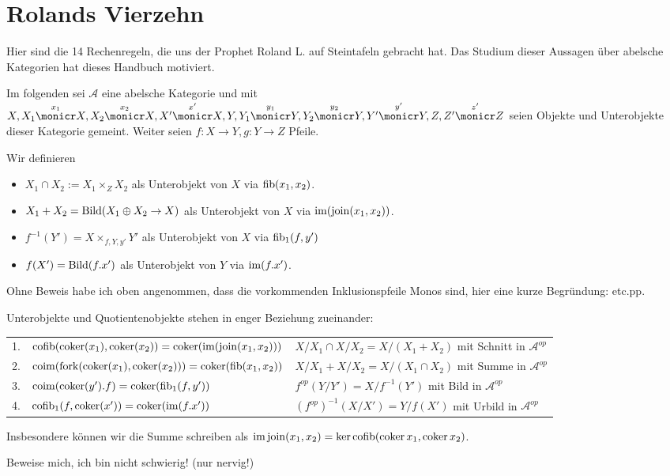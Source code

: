 \section{Rolands Vierzehn}

Hier sind die 14 Rechenregeln, die uns der Prophet Roland L. auf Steintafeln gebracht hat. Das Studium dieser Aussagen über abelsche Kategorien hat dieses Handbuch motiviert.

Im folgenden sei $\mathcal A$ eine abelsche Kategorie und mit $X,
X_1 \overset{x_1}\monicr X,
X_2 \overset{x_2}\monicr X,
X'  \overset{x'}\monicr X,
Y,
Y_1 \overset{y_1}\monicr Y,
Y_2 \overset{y_2}\monicr Y,
Y'  \overset{y'}\monicr Y,
Z,
Z'  \overset{z'}\monicr Z$
seien Objekte und Unterobjekte dieser Kategorie gemeint.
Weiter seien $f:X\to Y, g:Y\to Z$ Pfeile.

\begin{defn}[Objektnotation]
Wir definieren
\begin{itemize}
\item $X_1 \cap X_2 := X_1\times_Z X_2$ als Unterobjekt von $X$ via $\operatorname{fib}(x_1, x_2)$.
\item $X_1+X_2 = \operatorname{Bild}(X_1 \oplus X_2 \to X)$ als Unterobjekt von $X$ via $\operatorname{im}(\operatorname{join}(x_1,x_2))$.
\item $f^{-1}(Y') = X \times_{f,Y,y'} Y'$ als Unterobjekt von $X$ via $\operatorname{fib}_1(f,y')$
\item $f(X') = \operatorname{Bild}(f.x')$ als Unterobjekt von $Y$ via $\operatorname{im}(f.x')$.
\end{itemize}
\end{defn}

\begin{bem}
Ohne Beweis habe ich oben angenommen, dass die vorkommenden Inklusionspfeile Monos sind, hier eine kurze Begründung: etc.pp. %
\end{bem}

\begin{prop}[Reflexionsprinzip]
Unterobjekte und Quotientenobjekte stehen in enger Beziehung zueinander:

\begin{tabular}{rll}
   1.
&  $\operatorname{cofib}(\operatorname{coker}(x_1), \operatorname{coker}(x_2)) = \operatorname{coker}(\operatorname{im}(\operatorname{join}(x_1,x_2)))$
&  $X/X_1 \cap X/X_2 = X/(X_1+X_2)$ mit Schnitt in $\mathcal A^{op}$
\\ 2.
&  $\operatorname{coim}(\operatorname{fork}(\operatorname{coker}(x_1),\operatorname{coker}(x_2))) = \operatorname{coker}(\operatorname{fib}(x_1,x_2))$
&  $X/X_1 + X/X_2 = X/(X_1\cap X_2)$ mit Summe in $\mathcal A^{op}$
\\ 3.
&  $\operatorname{coim}(\operatorname{coker}(y').f) = \operatorname{coker}(\operatorname{fib}_1(f,y'))$
&  $f^{op}(Y/Y') = X/f^{-1}(Y')$ mit Bild in $\mathcal A^{op}$
\\ 4.
&  $\operatorname{cofib}_1(f,\operatorname{coker}(x')) = \operatorname{coker}(\operatorname{im}(f.x'))$
&  $(f^{op})^{-1}(X/X') = Y/f(X')$ mit Urbild in $\mathcal A^{op}$
\end{tabular}
Insbesondere können wir die Summe schreiben als $\operatorname{im}\operatorname{join}(x_1,x_2)
= \ker\operatorname{cofib}(\operatorname{coker} x_1,\operatorname{coker} x_2)$.
\end{prop}
\begin{bew}
Beweise mich, ich bin nicht schwierig! (nur nervig!)
\end{bew}


